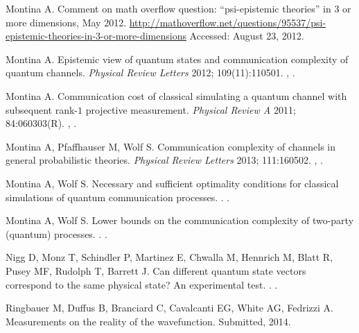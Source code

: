 \documentclass[DIV=calc,fontsize=12pt]{scrartcl} %
\theoremstyle{definition}
\theoremstyle{plain}
\begin{document}
\begin{thebibliography}{999}
Montina A.
\newblock Comment on math overflow question: ``psi-epistemic theories'' in 3 or more dimensions, May 2012.
\newblock
\url{http://mathoverflow.net/questions/95537/psi-epistemic-theories-in-3-or-more-dimensions}
Accessed: August 23, 2012.

Montina A.
\newblock Epistemic view of quantum states and communication complexity of quantum channels.
\newblock \emph{Physical Review Letters} 2012; 109(11):110501.
\newblock \href {http://arxiv.org/abs/1206.2961} {},
\href {http://dx.doi.org/10.1103/PhysRevLett.109.110501}
{}.

Montina A.
\newblock Communication cost of classical simulating a quantum channel with
subsequent rank-$1$ projective measurement.
\newblock \emph{Physical Review A} 2011; 84:060303(R).
\newblock \href {http://arxiv.org/abs/1110.5944} {},
\href {http://dx.doi.org/10.1103/PhysRevA.84.060303}
{}.

Montina A, Pfaffhauser M, Wolf S.
\newblock Communication complexity of channels in general probabilistic
theories.
\newblock \emph{Physical Review Letters} 2013; 111:160502.
\newblock \href {http://arxiv.org/abs/1301.4441} {},
\href {http://dx.doi.org/10.1103/PhysRevLett.111.160502}
{}.

Montina A, Wolf S.
\newblock Necessary and sufficient optimality conditions for classical simulations of quantum communication processes.
.
\newblock \href {http://arxiv.org/abs/1402.6299} {}.

Montina A, Wolf S.
\newblock Lower bounds on the communication complexity of two-party (quantum)
processes.
.
\newblock \href {http://arxiv.org/abs/1401.4126} {}.

Nigg D, Monz T, Schindler P, Martinez E, Chwalla M, Hennrich M, Blatt R, Pusey MF, Rudolph T, Barrett J.
\newblock Can different quantum state vectors correspond to the same physical state? An experimental test.
.
\newblock \href {http://arxiv.org/abs/1211.0942} {}.

Ringbauer M, Duffus B, Branciard C, Cavalcanti EG, White AG, Fedrizzi A.
\newblock Measurements on the reality of the wavefunction.
\newblock Submitted, 2014.


\end{thebibliography}
\end{document}
